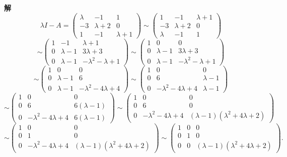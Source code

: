 \documentclass[UTF8, 12pt, fontset=fandol, oneside]{ctexart}
\begin{document}
\noindent\textbf{解}\quad
\[
\lambda I-A=
\left(\begin{array}{ccc}
\lambda & -1 & 1\\
-3 & \lambda+2 & 0\\
1 & -1 & \lambda+1
\end{array}\right)
\sim
\left(\begin{array}{ccc}
1 & -1 & \lambda+1\\
-3 & \lambda+2 & 0\\
\lambda & -1 & 1
\end{array}\right)
\]
\[
\sim
\left(\begin{array}{ccc}
1 & -1 & \lambda+1\\
0 & \lambda-1 & 3\lambda+3\\
0 & \lambda-1 & -\lambda^2-\lambda+1
\end{array}\right)
\sim
\left(\begin{array}{ccc}
1 & 0 & 0\\
0 & \lambda-1 & 3\lambda+3\\
0 & \lambda-1 & -\lambda^2-\lambda+1
\end{array}\right)
\]
\[
\sim
\left(\begin{array}{ccc}
1 & 0 & 0\\
0 & \lambda-1 & 6\\
0 & \lambda-1 & -\lambda^2-4\lambda+4
\end{array}\right)
\sim
\left(\begin{array}{ccc}
1 & 0 & 0\\
0 & 6 & \lambda-1\\
0 & -\lambda^2-4\lambda+4 & \lambda-1
\end{array}\right)
\]
\[
\sim
\left(\begin{array}{ccc}
1 & 0 & 0\\
0 & 6 & 6(\lambda-1)\\
0 & -\lambda^2-4\lambda+4 & 6(\lambda-1)
\end{array}\right)
\sim
\left(\begin{array}{ccc}
1 & 0 & 0\\
0 & 6 & 0\\
0 & -\lambda^2-4\lambda+4 & (\lambda-1)(\lambda^2+4\lambda+2)
\end{array}\right)
\]
\[
\sim
\left(\begin{array}{ccc}
1 & 0 & 0\\
0 & 1 & 0\\
0 & -\lambda^2-4\lambda+4 & (\lambda-1)(\lambda^2+4\lambda+2)
\end{array}\right)
\sim
\left(\begin{array}{ccc}
1 & 0 & 0\\
0 & 1 & 0\\
0 & 0 & (\lambda-1)(\lambda^2+4\lambda+2)
\end{array}\right).
\]
\end{document}
